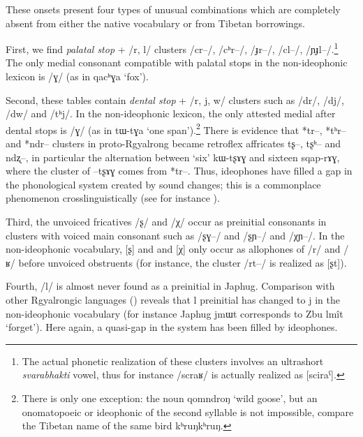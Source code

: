 \documentclass[oldfontcommands,oneside,a4paper,11pt]{article}
\newcommand{\ipa}[1]{{\phon \mbox{#1}}} %
\begin{document}

These onsets present four types of unusual combinations  which are completely absent from either the native vocabulary or from Tibetan borrowings.

First,  we find \textit{palatal stop} + /\ipa{r}, \ipa{l}/ clusters /\ipa{cr--}/, /\ipa{cʰr--}/, /\ipa{ɟr--}/, /\ipa{cl--}/, /\ipa{ɲɟl--}/.\footnote{The actual phonetic realization of these clusters involves an ultrashort \textit{svarabhakti} vowel, thus for instance /\ipa{scraʁ}/ is actually realized as [sciraˁ].} The only medial consonant compatible with palatal stops in the non-ideophonic lexicon is /\ipa{ɣ}/ (as in \ipa{qacʰɣa} `fox').

Second, these tables contain  \textit{dental stop} + /\ipa{r}, \ipa{j}, \ipa{w}/ clusters such as /\ipa{dr}/, /\ipa{dj}/,  /\ipa{dw}/ and /\ipa{tʰj}/. In the non-ideophonic lexicon, the only attested medial  after dental stops is /\ipa{ɣ}/ (as in \ipa{tɯ-tɣa} `one span').\footnote{There is only one  exception: the noun \ipa{qomndroŋ} `wild goose', but an onomatopoeic  or ideophonic of the second syllable is not impossible, compare the Tibetan name of the same bird \ipa{kʰruŋkʰruŋ}.} There is evidence that  *tr--, *tʰr-- and *ndr-- clusters in proto-Rgyalrong became retroflex affricates \ipa{tʂ--}, \ipa{tʂʰ--} and \ipa{ndʐ--}, in particular the alternation between `six' \ipa{kɯ-tʂɤɣ} and sixteen \ipa{sqap-rɤɣ}, where the cluster of \ipa{--tʂɤɣ} comes from *tr--. Thus,   ideophones have filled a gap in the phonological system created by sound changes; this is a commonplace phenomenon crosslinguistically (see for instance \citealt{diffloth80expressive}).

Third, the unvoiced fricatives /\ipa{ʂ}/ and /\ipa{χ}/ occur  as preinitial consonants in clusters with voiced main consonant such as /\ipa{ʂɣ--}/ and /\ipa{ʂɲ--}/ and /\ipa{χɲ--}/. In the non-ideophonic vocabulary, [ʂ] and and [χ] only occur as allophones of /\ipa{r}/ and /\ipa{ʁ}/ before unvoiced obstruents (for instance, the cluster /\ipa{rt--}/ is realized as [ʂt]). 

Fourth, /\ipa{l}/ is almost never found as a preinitial in Japhug. Comparison with other Rgyalrongic languages (\citealt[271-2]{jacques04these}) reveals that \ipa{l} preinitial has changed to \ipa{j} in the non-ideophonic vocabulary (for instance Japhug \ipa{jmɯt} corresponds to Zbu \ipa{lmît} `forget'). Here again, a quasi-gap in the system has been filled by ideophones.
\end{document}
